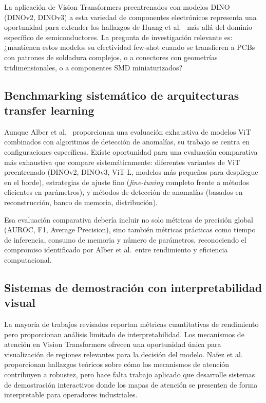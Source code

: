 La aplicación de Vision Transformers preentrenados con modelos DINO (DINOv2, DINOv3) a esta variedad de componentes electrónicos representa una oportunidad para extender los hallazgos de Huang et al.~\cite{huang2025semiconductor} más allá del dominio específico de semiconductores. La pregunta de investigación relevante es: ¿mantienen estos modelos su efectividad few-shot cuando se transfieren a PCBs con patrones de soldadura complejos, o a conectores con geometrías tridimensionales, o a componentes SMD miniaturizados?

\subsection{Benchmarking sistemático de arquitecturas transfer learning}

Aunque Alber et al.~\cite{alber2024evaluating} proporcionan una evaluación exhaustiva de modelos ViT combinados con algoritmos de detección de anomalías, su trabajo se centra en configuraciones específicas. Existe oportunidad para una evaluación comparativa más exhaustiva que compare sistemáticamente: diferentes variantes de ViT preentrenado (DINOv2, DINOv3, ViT-L, modelos más pequeños para despliegue en el borde), estrategias de ajuste fino (\textit{fine-tuning} completo frente a métodos eficientes en parámetros), y métodos de detección de anomalías (basados en reconstrucción, banco de memoria, distribución).

Esa evaluación comparativa debería incluir no solo métricas de precisión global (AUROC, F1, Average Precision), sino también métricas prácticas como tiempo de inferencia, consumo de memoria y número de parámetros, reconociendo el compromiso identificado por Alber et al.\ entre rendimiento y eficiencia computacional.

\subsection{Sistemas de demostración con interpretabilidad visual}

La mayoría de trabajos revisados reportan métricas cuantitativas de rendimiento pero proporcionan análisis limitado de interpretabilidad. Los mecanismos de atención en Vision Transformers ofrecen una oportunidad única para visualización de regiones relevantes para la decisión del modelo. Nafez et al.~\cite{nafez2025patchguard} proporcionan hallazgos teóricos sobre cómo los mecanismos de atención contribuyen a robustez, pero hace falta trabajo aplicado que desarrolle sistemas de demostración interactivos donde los mapas de atención se presenten de forma interpretable para operadores industriales.

